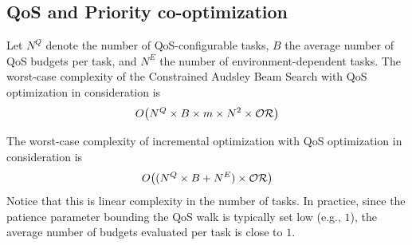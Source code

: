 \subsection{QoS and Priority co-optimization}
Let $N^Q$ denote the number of QoS-configurable tasks, $B$ the average number of QoS budgets per task, and $N^E$ the number of environment-dependent tasks.
The worst-case complexity of the Constrained Audsley Beam Search with QoS optimization in consideration is
\begin{equation}
    O\!\left(N^Q \times B \times m \times N^2 \times \mathcal{OR}{}\right)
\end{equation}

The worst-case complexity of incremental optimization with QoS optimization in consideration is
\begin{equation}
    O\!\left((N^Q \times B + N^E) \times \mathcal{OR}{}\right)
\end{equation}
Notice that this is linear complexity in the number of tasks.
In practice, since the patience parameter bounding the QoS walk is typically set low (e.g., $1$), the average number of budgets evaluated per task is close to $1$.

	
	
	
	


